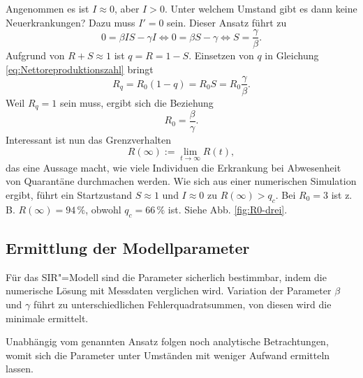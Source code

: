 \documentclass[a4paper,11pt,fleqn,twocolumn,twoside,dvipdfmx]{scrartcl}
\numberwithin{equation}{section}
\begin{document}
Angenommen es ist $I\approx 0$, aber $I>0$. Unter welchem Umstand
gibt es dann keine Neuerkrankungen? Dazu muss $I'=0$ sein. Dieser
Ansatz führt zu%
\begin{equation}\label{eq:S-gamma-beta}
0 = \beta IS-\gamma I \Leftrightarrow 0 = \beta S-\gamma
\Leftrightarrow S = \frac{\gamma}{\beta}.
\end{equation}
Aufgrund von $R+S\approx 1$ ist $q=R=1-S$. Einsetzen von
$q$ in Gleichung \eqref{eq:Nettoreproduktionszahl} bringt%
\begin{equation}
R_q = R_0(1-q) = R_0 S = R_0\frac{\gamma}{\beta}.
\end{equation}
Weil $R_q=1$ sein muss, ergibt sich die Beziehung%
\begin{equation}\label{eq:R0-beta-gamma}
R_0 = \frac{\beta}{\gamma}.
\end{equation}
Interessant ist nun das Grenzverhalten
\begin{equation}
R(\infty) := \lim_{t\to\infty} R(t),
\end{equation}
das eine Aussage macht, wie viele Individuen die Erkrankung bei
Abwesenheit von Quarantäne durchmachen werden. Wie sich aus einer
numerischen Simulation ergibt, führt ein
Startzustand $S\approx 1$ und $I\approx 0$ zu $R(\infty)>q_c$. Bei $R_0=3$
ist z.\,B. $R(\infty)=94\,\%$, obwohl $q_c=66\,\%$ ist. Siehe Abb.
\ref{fig:R0-drei}.


\subsection{Ermittlung der Modellparameter}

Für das SIR"=Modell sind die Parameter sicherlich bestimmbar,
indem die numerische Lösung mit Messdaten verglichen wird.
Variation der Parameter $\beta$ und $\gamma$ führt zu unterschiedlichen
Fehlerquadratsummen, von diesen wird die minimale ermittelt.

Unabhängig vom genannten Ansatz folgen noch analytische Betrachtungen,
womit sich die Parameter unter Umständen mit weniger Aufwand ermitteln
lassen.
\end{document}
